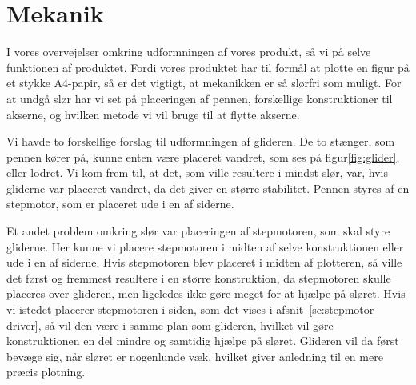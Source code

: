 \chapter[Design af mekanik]{Mekanik}


I vores overvejelser omkring udformningen af vores produkt, så vi på
selve funktionen af produktet. Fordi vores produktet har til formål at
plotte en figur på et stykke A4-papir, så er det vigtigt, at
mekanikken er så slørfri som muligt. For at undgå slør har vi set på
placeringen af pennen, forskellige konstruktioner til akserne, og
hvilken metode vi vil bruge til at flytte akserne.

Vi havde to forskellige forslag til udformningen af glideren. De to
stænger, som pennen kører på, kunne enten være placeret vandret, som
ses på figur\vref{fig:glider}, eller lodret. Vi kom frem til, at det,
som ville resultere i mindst slør, var, hvis gliderne var placeret
vandret, da det giver en større stabilitet. Pennen styres af en
stepmotor, som er placeret ude i en af siderne.


Et andet problem omkring slør var placeringen af stepmotoren, som skal
styre gliderne. Her kunne vi placere stepmotoren i midten af selve
konstruktionen eller ude i en af siderne. Hvis
stepmotoren blev placeret i midten af plotteren, så ville det først og
fremmest resultere i en større konstruktion, da stepmotoren skulle
placeres over glideren, men ligeledes ikke gøre meget for at hjælpe på
sløret. Hvis vi istedet placerer stepmotoren i siden, som det vises i
afsnit~\vref{sc:stepmotor-driver}, så vil den være i
samme plan som glideren, hvilket vil gøre konstruktionen en del
mindre og samtidig hjælpe på sløret. Glideren vil da først bevæge sig,
når sløret er nogenlunde væk, hvilket giver anledning til en mere
præcis plotning.

